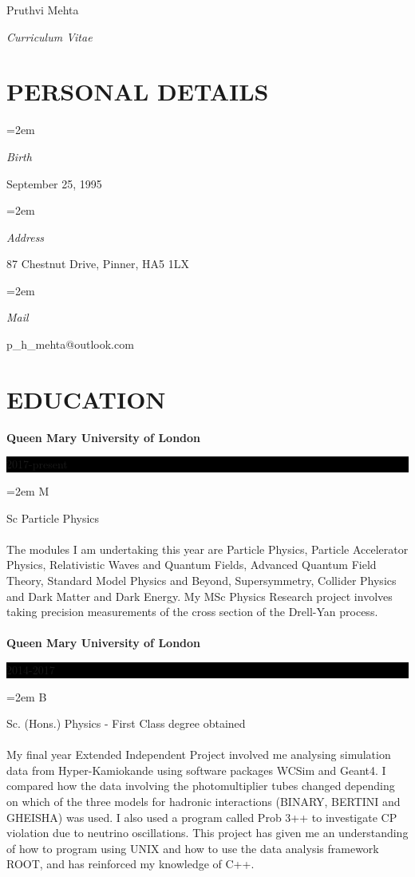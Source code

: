 \documentclass[paper=a4,fontsize=11pt]{scrartcl}	 			%
\newlength{\spacebox}
\newcommand{\MyName}[1]{
		\Huge \usefont{OT1}{phv}{b}{n} \hfill #1 		%
		\par \normalsize \normalfont}
\newcommand{\MySlogan}[1]{
		\large \usefont{OT1}{phv}{m}{n}\hfill \textit{#1} %
		\par \normalsize \normalfont}
\newcommand{\NewPart}[1]{\section*{\uppercase{#1}}}
\newcommand{\PersonalEntry}[2]{
		\noindent\hangindent=2em\hangafter=0 		%
		\parbox{\spacebox}{						%
		\textit{#1}}								%
		\hspace{1.5em} #2 \par}					%
\newcommand{\EducationEntry}[4]{
		\noindent \textbf{#1} \hfill 					%
		\colorbox{Black}{%
			\parbox{6em}{%
			\hfill\color{White}#2}} \par				%
		\noindent \textit{#3} \par					%
		\noindent\hangindent=2em\hangafter=0 \small #4 	%
		\normalsize \par}
\begin{document}
\MyName{Pruthvi Mehta}
\MySlogan{Curriculum Vitae}



\NewPart{Personal details}{}

\PersonalEntry{Birth}{September 25, 1995}
\PersonalEntry{Address}{87 Chestnut Drive, Pinner, HA5 1LX}
\PersonalEntry{Mail}{p{\_}h{\_}mehta@outlook.com}

\NewPart{Education}{}
\EducationEntry{Queen Mary University of London}{2017-present}
\newline

MSc Particle Physics
\paragraph{}
The modules I am undertaking this year are Particle Physics, Particle Accelerator Physics, Relativistic Waves and Quantum Fields, Advanced Quantum Field Theory, Standard Model Physics and Beyond, Supersymmetry, Collider Physics and Dark Matter and Dark Energy.
\newline
My MSc Physics Research project involves taking precision measurements of the cross section of the Drell-Yan process.
\paragraph{}
\EducationEntry{Queen Mary University of London}{2014-2017}
\newline

BSc. (Hons.) Physics - First Class degree obtained
\paragraph{}
My final year Extended Independent Project involved me analysing simulation data from Hyper-Kamiokande using software packages WCSim and Geant4. I compared how the data involving the photomultiplier tubes changed depending on which of the three models for hadronic interactions (BINARY, BERTINI and GHEISHA) was used. I also used a program called Prob 3++ to investigate CP violation due to neutrino oscillations. This project has given me an understanding of how to program using UNIX and how to use the data analysis framework ROOT, and has reinforced my knowledge of C++.
\end{document}
